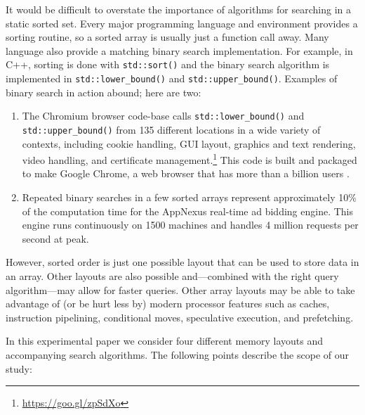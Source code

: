 \documentclass{patmorin}
\begin{document}
It would be difficult to overstate the importance of
algorithms for searching in a static sorted set.
Every major programming language and environment provides a sorting
routine, so a sorted array is usually just a function call away. Many
language also provide a matching binary search implementation.
For example, in C++, sorting is done with \texttt{std::sort()}
and the binary search algorithm is implemented in \texttt{std::lower_bound()}
and \texttt{std::upper_bound()}.
Examples of binary search in action abound; here are two:

\begin{enumerate}
\item The Chromium browser code-base
calls \texttt{std::lower_bound()} and
\texttt{std::upper_bound()} from 135 different locations
in a wide variety of contexts, including cookie handling, GUI
layout, graphics and text rendering, video handling, and certificate
management.\footnote{\url{https://goo.gl/zpSdXo}} This code
is built and packaged to make Google Chrome, a web browser that has more than a billion users \cite{protalinksi:google}.

\item Repeated binary searches in a few sorted arrays
represent approximately 10\% of the computation time for the AppNexus
real-time ad bidding engine. This engine runs continuously on 1500 machines
and handles 4 million requests per second at peak.
\end{enumerate}

However, sorted order is just one possible layout that can be used to
store data in an array. Other layouts are also possible and---combined
with the right query algorithm---may allow for faster queries.
Other array layouts may be able to take advantage of (or be hurt less
by) modern processor features such as caches, instruction pipelining,
conditional moves, speculative execution, and prefetching.

  
In this experimental paper we consider four different memory layouts and
accompanying search algorithms.  The following points describe the scope of our study:
\end{document}
